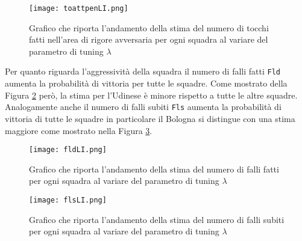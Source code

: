 \begin{figure}[htbp]
	\begin{center}
		\texttt{[image: toattpenLI.png]}
		\caption{Grafico che riporta l'andamento della stima del numero di tocchi fatti nell'area di rigore avversaria per ogni squadra al variare del parametro di tuning $\lambda$} \label{fig:toattpenLI}
	\end{center}
\end{figure}
Per quanto riguarda l'aggressività della squadra il numero di falli fatti \texttt{Fld} aumenta la probabilità di vittoria per tutte le squadre. Come mostrato della Figura \ref{fig:fldLI} però, la stima per l'Udinese è minore rispetto a tutte le altre squadre. Analogamente anche il numero di falli subiti \texttt{Fls} aumenta la probabilità di vittoria di tutte le squadre in particolare il Bologna si distingue con una stima maggiore come mostrato nella Figura \ref{fig:flsLI}.\\
\begin{figure}[]
	\begin{center}
		\texttt{[image: fldLI.png]}
		\caption{Grafico che riporta l'andamento della stima del numero di falli fatti per ogni squadra al variare del parametro di tuning $\lambda$} \label{fig:fldLI}
	\end{center}
\end{figure}
\begin{figure}[htbp]
	\begin{center}
		\texttt{[image: flsLI.png]}
		\caption{Grafico che riporta l'andamento della stima del numero di falli subiti per ogni squadra al variare del parametro di tuning $\lambda$} \label{fig:flsLI}
	\end{center}
\end{figure}

